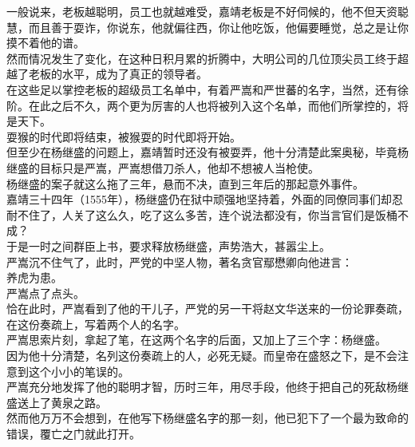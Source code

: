 \begin{multicols}{\theparacolNo}
一般说来，老板越聪明，员工也就越难受，嘉靖老板是不好伺候的，他不但天资聪慧，而且善于耍诈，你说东，他就偏往西，你让他吃饭，他偏要睡觉，总之是让你摸不着他的谱。\\

然而情况发生了变化，在这种日积月累的折腾中，大明公司的几位顶尖员工终于超越了老板的水平，成为了真正的领导者。\\

在这些足以掌控老板的超级员工名单中，有着严嵩和严世蕃的名字，当然，还有徐阶。在此之后不久，两个更为厉害的人也将被列入这个名单，而他们所掌控的，将是天下。\\

耍猴的时代即将结束，被猴耍的时代即将开始。\\

但至少在杨继盛的问题上，嘉靖暂时还没有被耍弄，他十分清楚此案奥秘，毕竟杨继盛的目标只是严嵩，严嵩想借刀杀人，他却不想被人当枪使。\\

杨继盛的案子就这么拖了三年，悬而不决，直到三年后的那起意外事件。\\

嘉靖三十四年（1555年），杨继盛仍在狱中顽强地坚持着，外面的同僚同事们却忍耐不住了，人关了这么久，吃了这么多苦，连个说法都没有，你当言官们是饭桶不成？\\

于是一时之间群臣上书，要求释放杨继盛，声势浩大，甚嚣尘上。\\

严嵩沉不住气了，此时，严党的中坚人物，著名贪官鄢懋卿向他进言：\\

养虎为患。\\

严嵩点了点头。\\

恰在此时，严嵩看到了他的干儿子，严党的另一干将赵文华送来的一份论罪奏疏，在这份奏疏上，写着两个人的名字。\\

严嵩思索片刻，拿起了笔，在这两个名字的后面，又加上了三个字：杨继盛。\\

因为他十分清楚，名列这份奏疏上的人，必死无疑。而皇帝在盛怒之下，是不会注意到这个小小的笔误的。\\

严嵩充分地发挥了他的聪明才智，历时三年，用尽手段，他终于把自己的死敌杨继盛送上了黄泉之路。\\

然而他万万不会想到，在他写下杨继盛名字的那一刻，他已犯下了一个最为致命的错误，覆亡之门就此打开。\\


\end{multicols}
